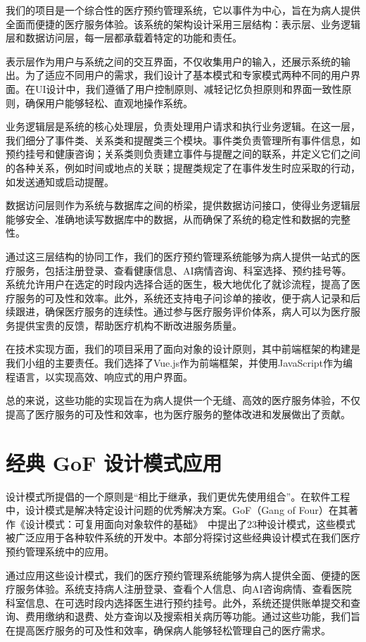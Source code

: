 我们的项目是一个综合性的医疗预约管理系统，它以事件为中心，旨在为病人提供全面而便捷的医疗服务体验。该系统的架构设计采用三层结构：表示层、业务逻辑层和数据访问层，每一层都承载着特定的功能和责任。

表示层作为用户与系统之间的交互界面，不仅收集用户的输入，还展示系统的输出。为了适应不同用户的需求，我们设计了基本模式和专家模式两种不同的用户界面。在UI设计中，我们遵循了用户控制原则、减轻记忆负担原则和界面一致性原则，确保用户能够轻松、直观地操作系统。

业务逻辑层是系统的核心处理层，负责处理用户请求和执行业务逻辑。在这一层，我们细分了事件类、关系类和提醒类三个模块。事件类负责管理所有事件信息，如预约挂号和健康咨询；关系类则负责建立事件与提醒之间的联系，并定义它们之间的各种关系，例如时间或地点的关联；提醒类规定了在事件发生时应采取的行动，如发送通知或启动提醒。

数据访问层则作为系统与数据库之间的桥梁，提供数据访问接口，使得业务逻辑层能够安全、准确地读写数据库中的数据，从而确保了系统的稳定性和数据的完整性。

通过这三层结构的协同工作，我们的医疗预约管理系统能够为病人提供一站式的医疗服务，包括注册登录、查看健康信息、AI病情咨询、科室选择、预约挂号等。系统允许用户在选定的时段内选择合适的医生，极大地优化了就诊流程，提高了医疗服务的可及性和效率。此外，系统还支持电子问诊单的接收，便于病人记录和后续跟进，确保医疗服务的连续性。通过参与医疗服务评价体系，病人可以为医疗服务提供宝贵的反馈，帮助医疗机构不断改进服务质量。

在技术实现方面，我们的项目采用了面向对象的设计原则，其中前端框架的构建是我们小组的主要责任。我们选择了Vue.js作为前端框架，并使用JavaScript作为编程语言，以实现高效、响应式的用户界面。

总的来说，这些功能的实现旨在为病人提供一个无缝、高效的医疗服务体验，不仅提高了医疗服务的可及性和效率，也为医疗服务的整体改进和发展做出了贡献。


\section{经典 GoF 设计模式应用}
设计模式所提倡的⼀个原则是“相比于继承，我们更优先使用组合”。在软件工程中，设计模式是解决特定设计问题的优秀解决方案。GoF（Gang of Four）在其著作《设计模式：可复用面向对象软件的基础》~\cite{gamma2019设计模式}中提出了23种设计模式，这些模式被广泛应用于各种软件系统的开发中。本部分将探讨这些经典设计模式在我们医疗预约管理系统中的应用。

通过应用这些设计模式，我们的医疗预约管理系统能够为病人提供全面、便捷的医疗服务体验。系统支持病人注册登录、查看个人信息、向AI咨询病情、查看医院科室信息、在可选时段内选择医生进行预约挂号。此外，系统还提供账单提交和查询、费用缴纳和退费、处方查询以及搜索相关病历等功能。通过这些功能，我们旨在提高医疗服务的可及性和效率，确保病人能够轻松管理自己的医疗需求。


